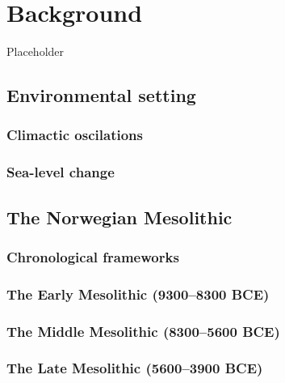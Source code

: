 \documentclass[
  oneside]{book}
\begin{document}
\hypertarget{background}{%
\chapter{Background}\label{background}}

Placeholder

\hypertarget{environmental-setting}{%
\section{Environmental setting}\label{environmental-setting}}

\hypertarget{climactic-oscilations}{%
\subsection{Climactic oscilations}\label{climactic-oscilations}}

\hypertarget{sea-level-change}{%
\subsection{Sea-level change}\label{sea-level-change}}

\hypertarget{the-norwegian-mesolithic}{%
\section{The Norwegian Mesolithic}\label{the-norwegian-mesolithic}}

\hypertarget{chronological-frameworks}{%
\subsection{Chronological frameworks}\label{chronological-frameworks}}

\hypertarget{the-early-mesolithic-93008300-bce}{%
\subsection{The Early Mesolithic (9300--8300 BCE)}\label{the-early-mesolithic-93008300-bce}}

\hypertarget{the-middle-mesolithic-83005600-bce}{%
\subsection{The Middle Mesolithic (8300--5600 BCE)}\label{the-middle-mesolithic-83005600-bce}}

\hypertarget{the-late-mesolithic-56003900-bce}{%
\subsection{The Late Mesolithic (5600--3900 BCE)}\label{the-late-mesolithic-56003900-bce}}
\end{document}
